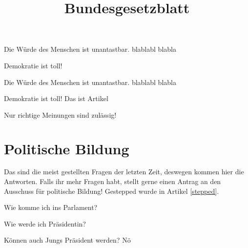 \documentclass{sasbase}
\begin{document}
\title{Bundesgesetzblatt}

\setcounter{secnumdepth}{5}

\mytitle



\lipsum[1]


\squarestyle
\begin{article}[Menschenwürde]
    \label{blabla}
    \item Die Würde des Menschen ist unantastbar. blablabl
        blabla
    \item Demokratie ist toll!
\end{article}

\parensstyle
\begin{lawparagraph}[Menschenwürde]
    \item Die Würde des Menschen ist unantastbar. blablabl
        blabla
    \item Demokratie ist toll! Das ist Artikel \thearticleno
\end{lawparagraph}


\begin{article}[Meinungsfreiheit]
    \item Nur richtige Meinungen sind zulässig!
\end{article}

\section{Politische Bildung}

Das sind die meist gestellten Fragen der letzten Zeit, deswegen
kommen hier die Antworten. Falls ihr mehr Fragen habt, stellt gerne
einen Antrag an den Ausschuss für politische Bildung!
Gestepped wurde in Artikel \ref{stepped}.


\begin{question}{Wie komme ich ins Parlament?}
    \lipsum[3]
\end{question}

\begin{question}{Wie werde ich Präsidentin?}
    \lipsum[5]
\end{question}

\begin{question}{Können auch Jungs Präsident werden?}
    Nö
\end{question}
\end{document}
